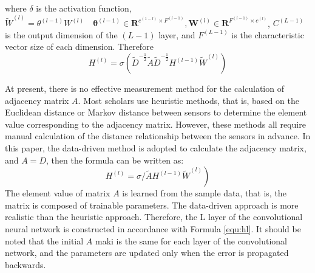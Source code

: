 \documentclass[journal,article,submit,moreauthors,pdftex]{Definitions/mdpi}
\begin{document}
where $\delta$ is the activation function, $\widetilde{W}^{(l)}=\theta^{(l-1)} W^{(l)} \quad \boldsymbol{\theta}^{(l-1)} \in \boldsymbol{R}^{c^{(1-l)} \times F^{(l-1)}}, \boldsymbol{W}^{(l)} \in \boldsymbol{R}^{F^{(l-1)} \times c^{(l)}}$,  $C^{(L-1)}$ is the output dimension of the $(L-1)$ layer, and $F^{(L-1)}$ is the characteristic vector size of each dimension. Therefore
\begin{equation}
    H^{(l)}=\sigma\left(\widetilde{D}^{-\frac{1}{2}} \widetilde{A} \widetilde{D}^{-\frac{1}{2}} H^{(l-1)} \widetilde{W}^{(l)}\right)
\end{equation}
\par At present, there is no effective measurement method for the calculation of adjacency matrix $A$. Most scholars use heuristic methods, that is, based on the Euclidean distance or Markov distance between sensors to determine the element value corresponding to the adjacency matrix. However, these methods all require manual calculation of the distance relationship between the sensors in advance. In this paper, the data-driven method is adopted to calculate the adjacency matrix, and $A = D$, then the formula can be written as:
\begin{equation}
    \left.H^{(l)}=\sigma / \widetilde{A} H^{(l-1)} \widetilde{W}^{(l)}\right)
    \label{equ:hl}
\end{equation}
The element value of matrix $A$ is learned from the sample data, that is, the matrix is composed of trainable parameters. The data-driven approach is more realistic than the heuristic approach. Therefore, the L layer of the convolutional neural network is constructed in accordance with Formula \ref{equ:hl}. It should be noted that the initial $A$ maki is the same for each layer of the convolutional network, and the parameters are updated only when the error is propagated backwards.
\end{document}

